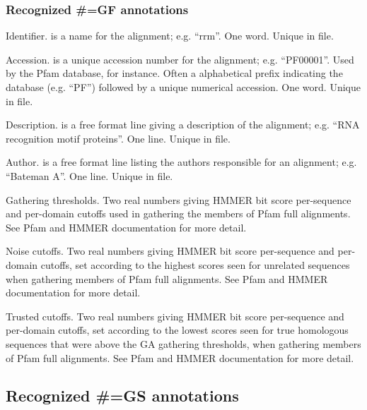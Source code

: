 \subsubsection{Recognized #=GF annotations}
\begin{wideitem}
\item [\emprog{ID  <s>}] 
	Identifier.  is a name for the alignment;
	e.g. ``rrm''. One word. Unique in file.

\item [\emprog{AC  <s>}]
	Accession.  is a unique accession number for the
	alignment; e.g. 
	``PF00001''. Used by the Pfam database, for instance. 
	Often a alphabetical prefix indicating the database
	(e.g. ``PF'') followed by a unique numerical accession.
	One word. Unique in file. 
	
\item [\emprog{DE  <s>}]
	Description.  is a free format line giving
	a description of the alignment; e.g.
	``RNA recognition motif proteins''. One line. Unique in file.

\item [\emprog{AU  <s>}]
	Author.  is a free format line listing the 
	authors responsible for an alignment; e.g. 
	``Bateman A''. One line. Unique in file.

\item [\emprog{GA  <f> <f>}]
	Gathering thresholds. Two real numbers giving HMMER bit score
	per-sequence and per-domain cutoffs used in gathering the
	members of Pfam full alignments. See Pfam and HMMER
	documentation for more detail.
	
\item [\emprog{NC  <f> <f>}]
	Noise cutoffs. Two real numbers giving HMMER bit score
	per-sequence and per-domain cutoffs, set according to the
	highest scores seen for unrelated sequences when gathering
	members of Pfam full alignments. See Pfam and HMMER
	documentation for more detail.

\item [\emprog{TC  <f> <f>}]
	Trusted cutoffs. Two real numbers giving HMMER bit score
	per-sequence and per-domain cutoffs, set according to the
	lowest scores seen for true homologous sequences that
	were above the GA gathering thresholds, when gathering
	members of Pfam full alignments. See Pfam and HMMER
	documentation for more detail.
\end{wideitem}

\subsection{Recognized #=GS annotations}

